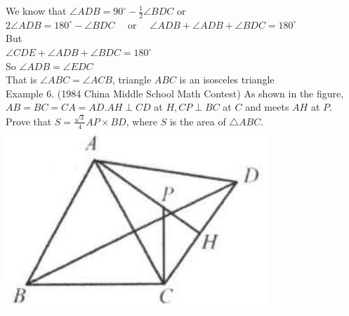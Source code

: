 \documentclass[10pt]{article}
\begin{document}
We know that \(\angle A D B=90^{\circ}-\frac{1}{2} \angle B D C\) or\\
\(2 \angle A D B=180^{\circ}-\angle B D C \quad\) or \(\quad \angle A D B+\angle A D B+\angle B D C=180^{\circ}\)\\
But\\
\(\angle C D E+\angle A D B+\angle B D C=180^{\circ}\)\\
So \(\angle A D B=\angle E D C\)\\
That is \(\angle A B C=\angle A C B\), triangle \(A B C\) is an isosceles triangle\\
Example 6. (1984 China Middle School Math Contest) As shown in the figure, \(A B=B C=C A=A D . A H \perp C D\) at \(H, C P \perp B C\) at \(C\) and meets \(A H\) at \(P\). Prove that \(S=\frac{\sqrt{3}}{4} A P \times B D\), where \(S\) is the area of \(\triangle A B C\).\\
\includegraphics[max width=\textwidth, center]{2025_04_17_97bc1f7e44d93c271a88g-197(1)}
\end{document}
